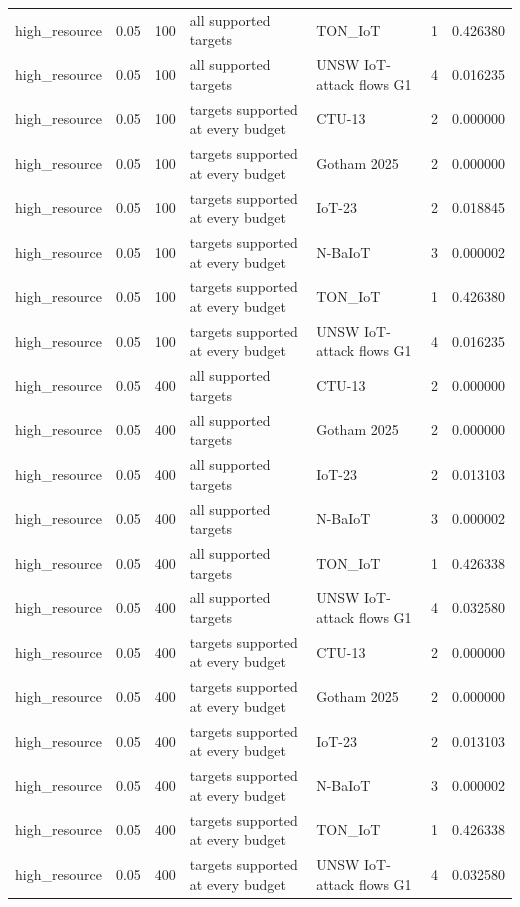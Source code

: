 \begin{tabular}{lllllll}
high\_resource & 0.05 & 100 & all supported targets & TON\_IoT & 1 & 0.426380 \\
high\_resource & 0.05 & 100 & all supported targets & UNSW IoT-attack flows G1 & 4 & 0.016235 \\
high\_resource & 0.05 & 100 & targets supported at every budget & CTU-13 & 2 & 0.000000 \\
high\_resource & 0.05 & 100 & targets supported at every budget & Gotham 2025 & 2 & 0.000000 \\
high\_resource & 0.05 & 100 & targets supported at every budget & IoT-23 & 2 & 0.018845 \\
high\_resource & 0.05 & 100 & targets supported at every budget & N-BaIoT & 3 & 0.000002 \\
high\_resource & 0.05 & 100 & targets supported at every budget & TON\_IoT & 1 & 0.426380 \\
high\_resource & 0.05 & 100 & targets supported at every budget & UNSW IoT-attack flows G1 & 4 & 0.016235 \\
high\_resource & 0.05 & 400 & all supported targets & CTU-13 & 2 & 0.000000 \\
high\_resource & 0.05 & 400 & all supported targets & Gotham 2025 & 2 & 0.000000 \\
high\_resource & 0.05 & 400 & all supported targets & IoT-23 & 2 & 0.013103 \\
high\_resource & 0.05 & 400 & all supported targets & N-BaIoT & 3 & 0.000002 \\
high\_resource & 0.05 & 400 & all supported targets & TON\_IoT & 1 & 0.426338 \\
high\_resource & 0.05 & 400 & all supported targets & UNSW IoT-attack flows G1 & 4 & 0.032580 \\
high\_resource & 0.05 & 400 & targets supported at every budget & CTU-13 & 2 & 0.000000 \\
high\_resource & 0.05 & 400 & targets supported at every budget & Gotham 2025 & 2 & 0.000000 \\
high\_resource & 0.05 & 400 & targets supported at every budget & IoT-23 & 2 & 0.013103 \\
high\_resource & 0.05 & 400 & targets supported at every budget & N-BaIoT & 3 & 0.000002 \\
high\_resource & 0.05 & 400 & targets supported at every budget & TON\_IoT & 1 & 0.426338 \\
high\_resource & 0.05 & 400 & targets supported at every budget & UNSW IoT-attack flows G1 & 4 & 0.032580 \\

\end{tabular}
